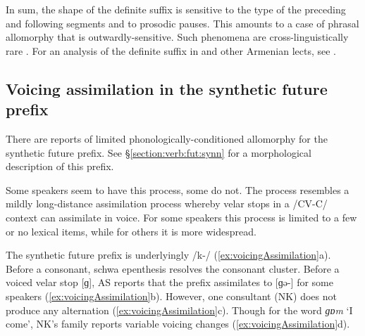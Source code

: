 		In sum, the shape of the definite suffix is sensitive to the type of the preceding and following segments and to prosodic pauses. This amounts to a case of phrasal allomorphy that is outwardly-sensitive. Such phenomena are cross-linguistically rare \citep{Paster-2006-PhonologicalConditionsAffixation}.	For an analysis of the definite suffix in {\iaIA} and other Armenian lects, see \citet{Dolatian-prep-Definite}.
		
		
		\subsection{Voicing assimilation in the synthetic future prefix}\label{section:morphophono:allomorphy: cond}
		
		There are reports of limited phonologically-conditioned allomorphy for the synthetic future prefix. See \S\ref{section:verb:fut:synn} for a morphological description of this prefix. 
		
		  Some speakers seem to have this process, some do not. The process resembles a mildly long-distance assimilation process whereby velar stops   in a /CV-C/ context can assimilate in voice. For some speakers this process is   limited to a few or no lexical items, while for others it is more widespread.
		
		The synthetic future prefix is underlyingly /{k}-/ (\ref{ex:voicingAssimilation}a). Before a consonant, schwa epenthesis resolves the consonant cluster. Before a voiced velar stop [ɡ], AS reports that the prefix assimilates to [ɡ{ə}-] for some speakers (\ref{ex:voicingAssimilation}b). However, one consultant (NK) does not produce any alternation (\ref{ex:voicingAssimilation}c). Though for the word \textit{{ɡɒm}} `I come', NK’s family reports variable voicing changes (\ref{ex:voicingAssimilation}d).
		
